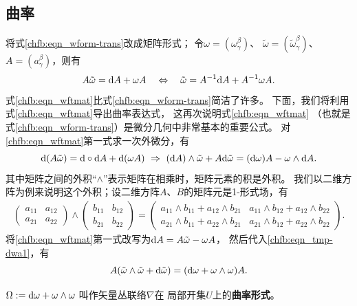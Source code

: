\subsection{曲率}

将式\eqref{chfb:eqn_wform-trans}改成矩阵形式；
令$\omega=(\omega_{\gamma}^\beta)$、
$\tilde{\omega}=(\tilde{\omega}_{\gamma}^\beta)$、
$A=(a_{\gamma}^\beta)$，则有
\begin{equation}\label{chfb:eqn_wftmat}
    A \tilde{\omega}= \dd A + \omega A
    \quad \Leftrightarrow \quad
    \tilde{\omega}= A^{-1} \dd A + A^{-1}\omega A .
\end{equation}
式\eqref{chfb:eqn_wftmat}比式\eqref{chfb:eqn_wform-trans}简洁了许多。
下面，我们将利用式\eqref{chfb:eqn_wftmat}导出曲率表达式，
这再次说明式\eqref{chfb:eqn_wftmat}
（也就是式\eqref{chfb:eqn_wform-trans}）是微分几何中非常基本的重要公式。
对\eqref{chfb:eqn_wftmat}第一式求一次外微分，有
\begin{equation}\label{chfb:eqn_tmp-dwa1}
    \dd (A \tilde{\omega})= \dd \circ\dd A + \dd (\omega A)
    \ \Rightarrow \
    (\dd A)\wedge \tilde{\omega}+ A \dd \tilde{\omega}
    =(\dd \omega) A - \omega\wedge \dd A .
\end{equation}
其中矩阵之间的外积“$\wedge$”表示矩阵在相乘时，矩阵元素的积是外积。
我们以二维方阵为例来说明这个外积；设二维方阵$A$、$B$的矩阵元是1-形式场，有
\begin{align*}
	\begin{pmatrix}
		a_{11} & a_{12} \\ a_{21} & a_{22}
	\end{pmatrix} \wedge
	\begin{pmatrix}
		b_{11} & b_{12} \\ b_{21} & b_{22}
	\end{pmatrix}
	=\begin{pmatrix}
		a_{11}\wedge b_{11} + a_{12}\wedge b_{21} & a_{11}\wedge b_{12} + a_{12}\wedge b_{22} \\
		a_{21}\wedge b_{11} + a_{22}\wedge b_{21} & a_{21}\wedge b_{12} + a_{22}\wedge b_{22}
	\end{pmatrix}.
\end{align*}
将\eqref{chfb:eqn_wftmat}第一式改写为$\dd A = A \tilde{\omega}-\omega A $，
然后代入\eqref{chfb:eqn_tmp-dwa1}，有
\begin{equation}\label{chfb:eqn_ATheta}
    A (\tilde{\omega}\wedge \tilde{\omega} + \dd \tilde{\omega} )
    =(\dd \omega +  \omega\wedge\omega )A .
\end{equation}

\begin{definition}
    $\Omega := \dd \omega +  \omega\wedge\omega$ 叫作矢量丛联络$\nabla$在
    局部开集$U$上的\textbf{曲率形式}。
\end{definition}


